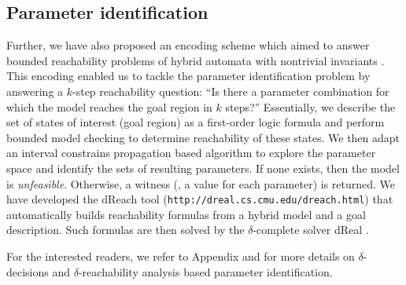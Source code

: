 \subsection{Parameter identification}
Further, we have also proposed an encoding scheme which aimed to answer bounded reachability problems of hybrid automata with nontrivial invariants \cite{liu14}. This encoding enabled us to tackle the parameter identification problem by answering a $k$-step reachability question: ``Is there a parameter
combination for which the model reaches the goal region in $k$ steps?'' Essentially, we describe the set of states of interest (goal region) as a first-order logic formula and perform bounded model checking \cite{BMC} to determine reachability of these states. We then adapt an interval constrains propagation based algorithm to explore the parameter space and identify the sets of resulting parameters. If none exists, then the model is 
{\em unfeasible}. Otherwise, a witness (\ie, a value for each parameter) is returned. We have developed the dReach tool (\verb#http://dreal.cs.cmu.edu/dreach.html#) that automatically builds reachability formulas from a hybrid model and a goal description. Such formulas are then solved by the $\delta$-complete solver dReal \citep{dreal}.

For the interested readers, we refer to Appendix and \cite{liu14} for more details on $\delta$-decisions and $\delta$-reachability analysis based parameter identification.

